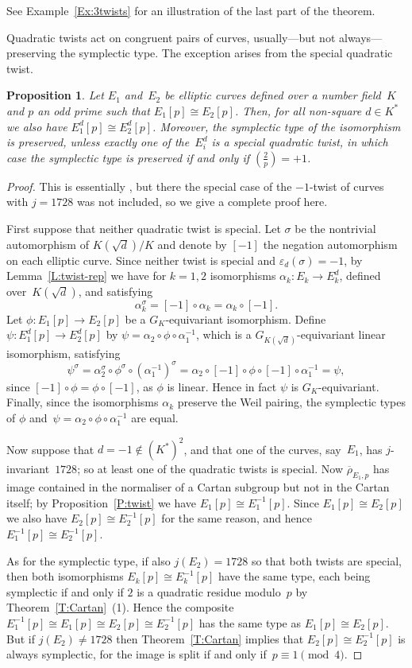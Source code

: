 \documentclass[12pt, reqno]{amsart}
\newcommand{\rhobar}{{\overline{\rho}}}
\newcommand{\eps}{\varepsilon}
\def\legendre#1#2{\left(\displaystyle\frac{#1}{#2}\right)}
\numberwithin{equation}{section}
\newtheorem{proposition}[theorem]{Proposition}
\theoremstyle{definition}
\theoremstyle{remark}
\begin{document}
See Example~\ref{Ex:3twists} for an illustration of the last part of
the theorem.

Quadratic twists act on congruent pairs of curves, usually---but not
always---preserving the symplectic type.  The exception arises from
the special quadratic twist.

\begin{proposition}\label{P:twist-cong}
Let $E_1$ and~$E_2$ be elliptic curves defined over a number field~$K$
and $p$ an odd prime such that $E_1[p]\cong E_2[p]$.  Then, for all
non-square $d\in K^*$ we also have $E_1^d[p]\cong E_2^d[p]$.
Moreover, the symplectic type of the isomorphism is preserved, unless
exactly one of the~$E_i^d$ is a special quadratic twist, in which case
the symplectic type is preserved if and only if $\legendre{2}{p}=+1$.
\end{proposition}
\begin{proof}
This is essentially \cite[Lemma~11]{FKSym}, but there the special case
of the $-1$-twist of curves with $j=1728$ was not included, so we give
a complete proof here.

First suppose that neither quadratic twist is special.  Let $\sigma$
be the nontrivial automorphism of $K(\sqrt{d})/K$ and denote by $[-1]$
the negation automorphism on each elliptic curve.  Since neither twist
is special and $\eps_d(\sigma)=-1$, by Lemma~\ref{L:twist-rep} we have
for $k=1,2$ isomorphisms $\alpha_k:E_k\to E_k^d$, defined
over~$K(\sqrt{d})$, and satisfying
\[
\alpha_k^{\sigma} = [-1]\circ\alpha_k = \alpha_k\circ[-1].
\]
  Let $\phi:E_1[p]\to E_2[p]$ be a
$G_K$-equivariant isomorphism.  Define $\psi:E_1^d[p]\to E_2^d[p]$ by
$\psi=\alpha_2\circ\phi\circ\alpha_1^{-1}$, which is a
$G_{K(\sqrt{d})}$-equivariant linear isomorphism, satisfying
\[
\psi^{\sigma} =
\alpha_2^{\sigma}\circ\phi^{\sigma}\circ(\alpha_1^{-1})^{\sigma} =
\alpha_2\circ[-1]\circ\phi\circ[-1]\circ\alpha_1^{-1} = \psi,
\]
since $[-1]\circ\phi=\phi\circ[-1]$, as $\phi$ is linear.  Hence in
fact $\psi$ is $G_K$-equivariant.  Finally, since the isomorphisms
$\alpha_k$ preserve the Weil pairing, the symplectic types of $\phi$
and~$\psi=\alpha_2\circ\phi\circ\alpha_1^{-1}$ are equal.

Now suppose that $d=-1\notin(K^*)^2$, and that one of the curves,
say~$E_1$, has $j$-invariant~$1728$; so at least one of the quadratic
twists is special.  Now $\rhobar_{E_1,p}$ has image contained in the
normaliser of a Cartan subgroup but not in the Cartan itself; by
Proposition~\ref{P:twist} we have $E_1[p]\cong E_1^{-1}[p]$.  Since
$E_1[p]\cong E_2[p]$ we also have $E_2[p]\cong E_2^{-1}[p]$ for the
same reason, and hence $E_1^{-1}[p]\cong E_2^{-1}[p]$.

As for the symplectic type, if also $j(E_2)=1728$ so that both twists
are special, then both isomorphisms $E_k[p]\cong E_k^{-1}[p]$ have the
same type, each being symplectic if and only if $2$ is a quadratic
residue modulo~$p$ by Theorem~\ref{T:Cartan}~(1).  Hence the composite
$E_1^{-1}[p]\cong E_1[p]\cong E_2[p]\cong E_2^{-1}[p]$ has the same
type as $E_1[p]\cong E_2[p]$.  But if $j(E_2)\not=1728$ then
Theorem~\ref{T:Cartan} implies that $E_2[p]\cong E_2^{-1}[p]$ is
always symplectic, for the image is split if and only
if~$p\equiv1\pmod4$.
\end{proof}
\end{document}
